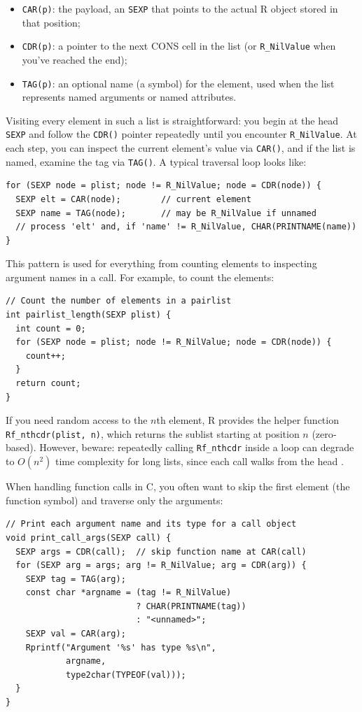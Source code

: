 \begin{itemize}
  \item \texttt{CAR(p)}: the payload, an \texttt{SEXP} that points to the actual R object stored in that position;
  \item \texttt{CDR(p)}: a pointer to the next CONS cell in the list (or \texttt{R\_NilValue} when you’ve reached the end);
  \item \texttt{TAG(p)}: an optional name (a symbol) for the element, used when the list represents named arguments or named attributes.
\end{itemize}

Visiting every element in such a list is straightforward: you begin at the head \texttt{SEXP} and follow the \texttt{CDR()} pointer repeatedly until you encounter \texttt{R\_NilValue}.  At each step, you can inspect the current element’s value via \texttt{CAR()}, and if the list is named, examine the tag via \texttt{TAG()}.  A typical traversal loop looks like:

\begin{verbatim}
for (SEXP node = plist; node != R_NilValue; node = CDR(node)) {
  SEXP elt = CAR(node);        // current element
  SEXP name = TAG(node);       // may be R_NilValue if unnamed
  // process 'elt' and, if 'name' != R_NilValue, CHAR(PRINTNAME(name))
}
\end{verbatim}

This pattern is used for everything from counting elements to inspecting argument names in a call.  For example, to count the elements:

\begin{verbatim}
// Count the number of elements in a pairlist
int pairlist_length(SEXP plist) {
  int count = 0;
  for (SEXP node = plist; node != R_NilValue; node = CDR(node)) {
    count++;
  }
  return count;
}
\end{verbatim}

If you need random access to the \(n\)th element, R provides the helper function \texttt{Rf\_nthcdr(plist, n)}, which returns the sublist starting at position \(n\) (zero‐based).  However, beware: repeatedly calling \texttt{Rf\_nthcdr} inside a loop can degrade to \(O(n^2)\) time complexity for long lists, since each call walks from the head \cite{wickham_pairlists}.  

When handling function calls in C, you often want to skip the first element (the function symbol) and traverse only the arguments:

\begin{verbatim}
// Print each argument name and its type for a call object
void print_call_args(SEXP call) {
  SEXP args = CDR(call);  // skip function name at CAR(call)
  for (SEXP arg = args; arg != R_NilValue; arg = CDR(arg)) {
    SEXP tag = TAG(arg);
    const char *argname = (tag != R_NilValue)
                          ? CHAR(PRINTNAME(tag))
                          : "<unnamed>";
    SEXP val = CAR(arg);
    Rprintf("Argument '%s' has type %s\n",
            argname,
            type2char(TYPEOF(val)));
  }
}
\end{verbatim}

